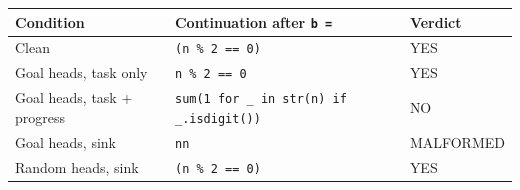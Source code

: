 \begin{tabular}{lp{.48\linewidth}l}\toprule
Condition & Continuation after \texttt{b =} & Verdict\\\midrule
Clean & \texttt{(n \% 2 == 0)} & YES\\
Goal heads, task only & \texttt{n \% 2 == 0} & YES\\
Goal heads, task + progress & \texttt{sum(1 for \_ in str(n) if \_.isdigit())} & NO\\
Goal heads, sink & \texttt{nn\textasciigrave{}} & MALFORMED\\
Random heads, sink & \texttt{(n \% 2 == 0)} & YES\\
\bottomrule\end{tabular}